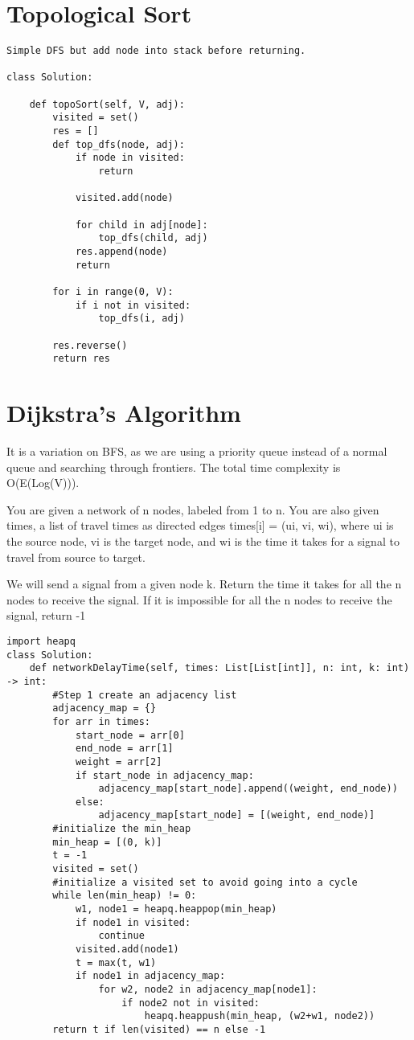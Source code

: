 \documentclass[24pt, a4]{article}
\begin{document}
\section{Topological Sort}
\begin{lstlisting}
Simple DFS but add node into stack before returning.

class Solution:

    def topoSort(self, V, adj):
        visited = set()
        res = []
        def top_dfs(node, adj):
            if node in visited:
                return

            visited.add(node)

            for child in adj[node]:
                top_dfs(child, adj)
            res.append(node)
            return

        for i in range(0, V):
            if i not in visited:
                top_dfs(i, adj)

        res.reverse()
        return res
\end{lstlisting}
\newpage
\section{Dijkstra's Algorithm}
It is a variation on BFS, as we are using a priority queue instead of a normal
queue and searching through frontiers. The total time complexity is 
O(E(Log(V))). 

You are given a network of n nodes, labeled from 1 to n. You are also given 
times, a list of travel times as directed edges times[i] = (ui, vi, wi), 
where ui is the source node, vi is the target node, and wi is the time it 
takes for a signal to travel from source to target.

We will send a signal from a given node k. Return the time it takes for all 
the n nodes to receive the signal. If it is impossible for all the n nodes to 
receive the signal, return -1
\begin{lstlisting}
import heapq
class Solution:
    def networkDelayTime(self, times: List[List[int]], n: int, k: int) -> int:
        #Step 1 create an adjacency list
        adjacency_map = {}
        for arr in times:
            start_node = arr[0]
            end_node = arr[1]
            weight = arr[2]
            if start_node in adjacency_map:
                adjacency_map[start_node].append((weight, end_node))
            else:
                adjacency_map[start_node] = [(weight, end_node)]        
        #initialize the min_heap
        min_heap = [(0, k)]
        t = -1
        visited = set()
        #initialize a visited set to avoid going into a cycle
        while len(min_heap) != 0:
            w1, node1 = heapq.heappop(min_heap)
            if node1 in visited:
                continue
            visited.add(node1)
            t = max(t, w1)
            if node1 in adjacency_map:
                for w2, node2 in adjacency_map[node1]:
                    if node2 not in visited:
                        heapq.heappush(min_heap, (w2+w1, node2))
        return t if len(visited) == n else -1
\end{lstlisting}
\newpage
\end{document}
